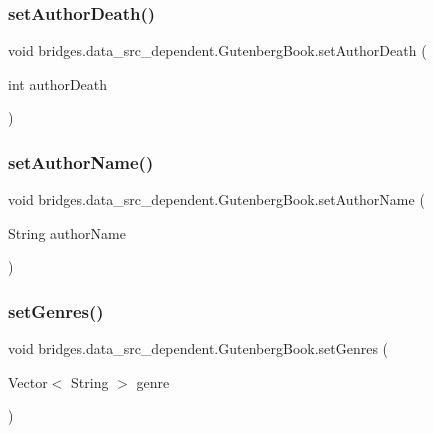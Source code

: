 \subsubsection{\texorpdfstring{set\+Author\+Death()}{setAuthorDeath()}}
{\footnotesize\ttfamily void bridges.\+data\+\_\+src\+\_\+dependent.\+Gutenberg\+Book.\+set\+Author\+Death (\begin{DoxyParamCaption}\item[{int}]{author\+Death }\end{DoxyParamCaption})}

\hypertarget{classbridges_1_1data__src__dependent_1_1_gutenberg_book_a6d6e1ccac0fc2e0b09aa6ac6fbe727bc}{}\label{classbridges_1_1data__src__dependent_1_1_gutenberg_book_a6d6e1ccac0fc2e0b09aa6ac6fbe727bc} 
\subsubsection{\texorpdfstring{set\+Author\+Name()}{setAuthorName()}}
{\footnotesize\ttfamily void bridges.\+data\+\_\+src\+\_\+dependent.\+Gutenberg\+Book.\+set\+Author\+Name (\begin{DoxyParamCaption}\item[{String}]{author\+Name }\end{DoxyParamCaption})}

\hypertarget{classbridges_1_1data__src__dependent_1_1_gutenberg_book_a76bf1d07025029f0cc9443a6d3d5a956}{}\label{classbridges_1_1data__src__dependent_1_1_gutenberg_book_a76bf1d07025029f0cc9443a6d3d5a956} 
\subsubsection{\texorpdfstring{set\+Genres()}{setGenres()}}
{\footnotesize\ttfamily void bridges.\+data\+\_\+src\+\_\+dependent.\+Gutenberg\+Book.\+set\+Genres (\begin{DoxyParamCaption}\item[{Vector$<$ String $>$}]{genre }\end{DoxyParamCaption})}

